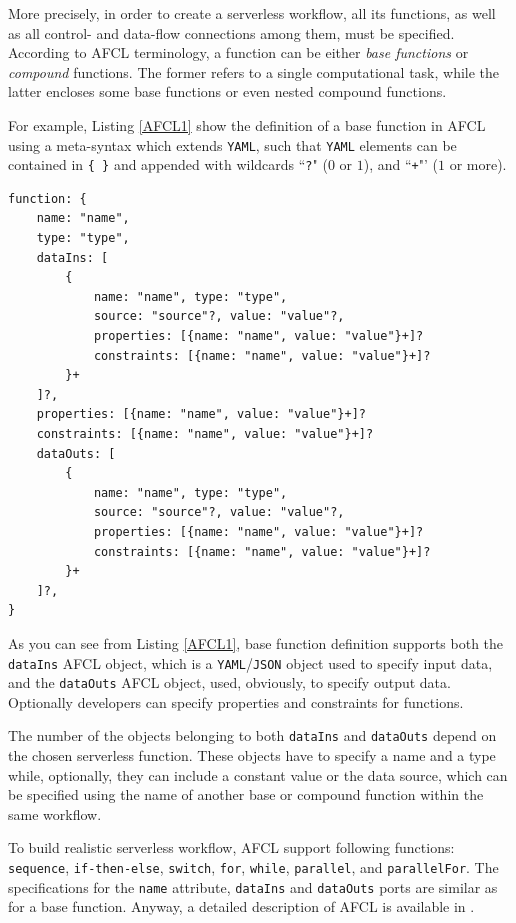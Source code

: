 \documentclass[12pt,a4paper]{report}
\newcommand{\QuoteIntro}{``}
\begin{document}
More precisely, in order to create a serverless workflow, all its functions, as well as all control- and data-flow connections among them, must be specified. According to AFCL terminology, a function can be either \textit{base functions} or \textit{compound} functions. The former refers to a single computational task, while the latter encloses some base functions or even nested compound functions.

For example, Listing \ref{AFCL1} show the definition of a base function in AFCL using a meta-syntax which extends \texttt{YAML}, such that \texttt{YAML} elements can be contained in \texttt{\{ \}} and appended with wildcards \QuoteIntro\texttt{?}" ($0$ or $1$), and \QuoteIntro\texttt{+}"’ ($1$ or more).

\begin{lstlisting}[frame=lines, caption={Definition of a base function in AFCL}, label={AFCL1}]
function: {
	name: "name",
	type: "type",
	dataIns: [
		{
			name: "name", type: "type",
			source: "source"?, value: "value"?,
			properties: [{name: "name", value: "value"}+]?
			constraints: [{name: "name", value: "value"}+]?
		}+
	]?,
	properties: [{name: "name", value: "value"}+]?
	constraints: [{name: "name", value: "value"}+]?
	dataOuts: [
		{
			name: "name", type: "type",
			source: "source"?, value: "value"?,
			properties: [{name: "name", value: "value"}+]?
			constraints: [{name: "name", value: "value"}+]?
		}+
	]?,
}
\end{lstlisting}

As you can see from Listing \ref{AFCL1}, base function definition supports both the \texttt{dataIns} AFCL object, which is a \texttt{YAML}/\texttt{JSON} object used to specify input data, and the \texttt{dataOuts} AFCL object, used, obviously, to specify output data\cite{AFCL}. Optionally developers can specify properties and constraints for functions. 

The number of the objects belonging to both \texttt{dataIns} and \texttt{dataOuts} depend on the chosen serverless function. These objects have to specify a name and a type while, optionally, they can include a constant value or the data source, which can be specified using the name of another base or compound function within the same workflow. 

To build realistic serverless workflow, AFCL support following functions: \texttt{sequence}, \texttt{if-then-else}, \texttt{switch}, \texttt{for}, \texttt{while}, \texttt{parallel}, and \texttt{parallelFor}. The specifications for the \texttt{name} attribute, \texttt{dataIns} and \texttt{dataOuts} ports are similar as for a base function. Anyway, a detailed description of AFCL is available in \cite{AFCL}.
\end{document}
